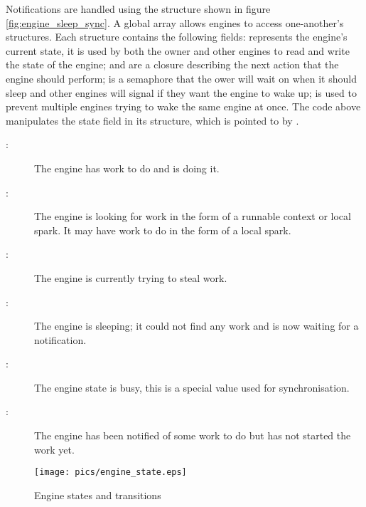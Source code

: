 Notifications are handled using the \enginesleepsync structure shown in
figure \ref{fig:engine_sleep_sync}.
A global array allows engines to access one-another's \enginesleepsync
structures.
Each structure contains the following fields:
 represents the engine's current state,
it is used by both the owner and other engines to read and write the state
of the engine;
 and  are a closure describing
the next action that the engine should perform;
 is a semaphore that the ower will wait on when it should
sleep and other engines will signal if they want the engine to wake up;
 is used to prevent multiple engines trying to wake the same
engine at once.
The \idle code above manipulates the state field in its structure,
which is pointed to by .

\begin{description}
    \item[:] The engine has work to do and is doing it.

    \item[:] The engine is looking for work in
        the form of a runnable context or local spark.  It may have work to
        do in the form of a local spark.

    \item[:] The engine is currently trying to steal work.

    \item[:] The engine is sleeping; it could not find any
        work and is now waiting for a notification.

    \item[:] The engine state is busy, this is a special value
        used for synchronisation.

    \item[:] The engine has been notified of some work to
        do but has not started the work yet.
\end{description}

\begin{figure}
\begin{center}
\texttt{[image: pics/engine\_state.eps]}
\end{center}
\caption{Engine states and transitions}
\label{fig:engine_states}
\end{figure}

